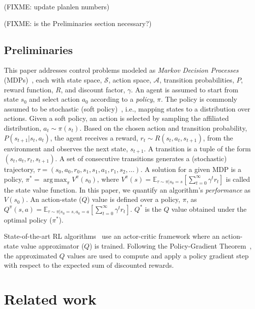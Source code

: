 \documentclass{article}
\DeclareMathOperator*{\argmax}{arg\,max}
\begin{document}
        (FIXME: update planlen numbers)
        
        (FIXME: is the Preliminaries section necessary?)

        \subsection{Preliminaries}
            This paper addresses control problems modeled as \textit{Markov Decision Processes} (MDPs)~\cite{puterman2014markov}, each with state space, $\mathcal{S}$, action space, $\mathcal{A}$, transition probabilities, $P$, reward function, $R$, and discount factor, $\gamma$. 
            An agent is assumed to start from state $s_0$ and select action $a_0$ according to a \textit{policy}, $\pi$. The policy is commonly assumed to be stochastic (soft policy)~\cite{haarnoja2018soft}, i.e., mapping states to a distribution over actions.
            Given a soft policy, an action is selected by sampling the affiliated distribution, $a_t \sim \pi(s_t)$. Based on the chosen action and transition probability, $P(s_{t+1} | s_t, a_t)$, the agent receives a reward, $r_t \sim R(s_t, a_t, s_{t+1})$, from the environment and observes the next state, $s_{t+1}$. A transition is a tuple of the form $(s_t,a_t,r_t,s_{t+1})$. A set of consecutive transitions generates a (stochastic) trajectory, $\tau = (s_0, a_0, r_0, s_1, s_1, a_1, r_1, s_2,\ldots)$. A solution for a given MDP is a policy, $\pi^* = \argmax_{\pi} V^{\pi}(s_0)$, where $V^{\pi}(s)=\mathbb{E}_{\tau \sim \pi| s_0=s}[\sum_{t=0}^{\infty}\gamma^t r_t]$ is called the state value function. In this paper, we quantify an algorithm's \textit{performance} as $V(s_0)$. An action-state ($Q$) value is defined over a policy, $\pi$, as $Q^\pi(s,a)=\mathbb{E}_{\tau \sim \pi | s_0=s, a_0=a}[\sum_{t=0}^{\infty}\gamma^t r_t]$. $Q^*$ is the $Q$ value obtained under the optimal policy ($\pi^*$). %

            State-of-the-art RL algorithms~\cite{haarnoja2018soft} use an actor-critic framework where an action-state value approximator ($Q$) is trained. Following the Policy-Gradient Theorem~\cite{reinforce}, the approximated $Q$ values are used to compute and apply a policy gradient step with respect to the expected sum of discounted rewards.

    \section{Related work}
\end{document}
